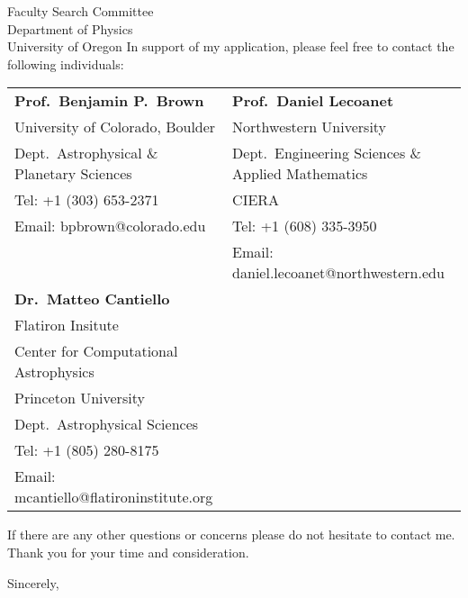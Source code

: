 \documentclass[11pt]{letter}
\begin{document}
\begin{letter}{
               Faculty Search Committee \\
               Department of Physics \\
               University of Oregon
           }
    In support of my application, please feel free to contact the following individuals:

    \footnotesize
    \begin{tabular}{ll}
        \textbf{Prof.~Benjamin P.~Brown}                        &\hspace{0.25in} \textbf{Prof.~Daniel Lecoanet}                     \\
        University of Colorado, Boulder                         &\hspace{0.25in} Northwestern University    \\
        \hspace{0.2in}Dept.~Astrophysical \& Planetary Sciences &\hspace{0.45in} Dept.~Engineering Sciences \& Applied Mathematics \\
        Tel: +1 (303) 653-2371                                    &\hspace{0.45in} CIERA                          \\
        Email: bpbrown@colorado.edu                             &\hspace{0.25in} Tel: +1 (608) 335-3950 \\
                                                                &\hspace{0.25in} Email: daniel.lecoanet@northwestern.edu             \\

        \textbf{Dr.~Matteo Cantiello}                          & \\
         Flatiron Insitute                                     & \\
         \hspace{0.2in}Center for Computational Astrophysics   & \\
         Princeton University                                  & \\
         \hspace{0.2in}Dept.~Astrophysical Sciences & \\
         Tel: +1 (805) 280-8175  & \\
         Email: mcantiello@flatironinstitute.org & \\
    \end{tabular}

    \normalsize
    If there are any other questions or concerns please do not hesitate to contact me.
    Thank you for your time and consideration.

\closing{Sincerely,}
\vspace{-0.9in}
\\
\end{letter}
\end{document}
